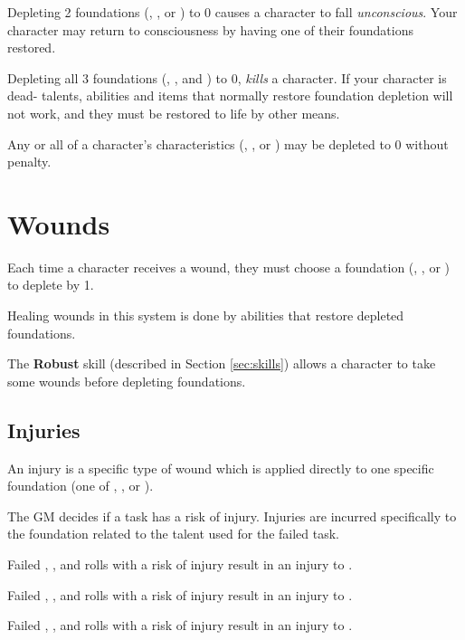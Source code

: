 Depleting 2 foundations (, , or ) to 0 causes a character to fall \emph{unconscious}. Your character may return to consciousness by having one of their foundations restored.

Depleting all 3 foundations (, , and ) to 0, \emph{kills} a character. If your character is dead- talents, abilities and items that normally restore foundation depletion will not work, and they must be restored to life by other means.

Any or all of a character's characteristics (, , or ) may be depleted to 0 without penalty.

\section{Wounds}

Each time a character receives a wound, they must choose a foundation (, , or ) to deplete by 1.

Healing wounds in this system is done by abilities that restore depleted foundations.

The \textbf{Robust} skill (described in Section \ref{sec:skills}) allows a character to take some wounds before depleting foundations.

\subsection{Injuries}

An injury is a specific type of wound which is applied directly to one specific foundation (one of , , or ).

The GM decides if a task has a risk of injury. Injuries are incurred specifically to the foundation related to the talent used for the failed task.

Failed , , and  rolls with a risk of injury result in an injury to .

Failed , , and  rolls with a risk of injury result in an injury to .

Failed , , and  rolls with a risk of injury result in an injury to .

